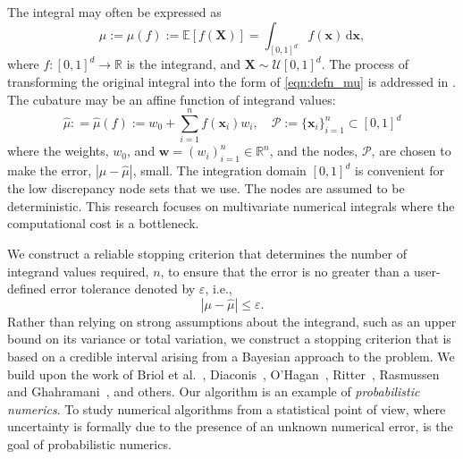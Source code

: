 \documentclass{svjour3}                     %
\newcommand{\bm}[1]{\boldsymbol{#1}}
\newcommand{\dif}[1]{\text{d}{#1}}
\newcommand{\reals}{\mathbb{R}}
\newcommand{\Ex}{\mathbb{E}}
\newcommand{\vw}{\bm{w}}
\newcommand{\vx}{\bm{x}}
\newcommand{\dvx}{\dif{\bm{x}}}
\newcommand{\hmu}{\widehat{\mu}}
\newcommand{\errtol}{\varepsilon}
\def\abs#1{\ensuremath{\left \lvert #1 \right \rvert}}
\begin{document}
The integral may often be expressed as
\begin{equation}
\label{eqn:defn_mu}
\mu:= \mu(f) := \Ex[f(\boldsymbol{X})] = \int_{[0,1]^d} f(\vx)\, \dvx, 
\end{equation}
where $f:[0,1]^d \to \reals$ is the integrand, and $\boldsymbol{X} \sim \mathcal{U}[0,1]^d$.  The process of transforming the original integral into the form of \eqref{eqn:defn_mu} is addressed in \cite{BecHae92b, Sid08a, Sid93, Lau96a, CriEtal07}.  The cubature may be an affine function of integrand values:
\begin{equation}
\label{eqn:defn_hmu}  %
\hmu: = \hmu(f) := w_0 + \sum_{i=1}^{n} f(\vx_i) w_i, \quad \mathcal{P} :=\{\vx_i\}_{i=1}^n \subset [0,1]^d
\end{equation}
where the weights, $w_0$, and  $\vw = (w_i)_{i=1}^n \in \reals^n$, and the nodes, $\mathcal{P}$, are chosen to make the error, $\abs{\mu - \hmu}$, small. The integration domain $[0,1]^d$ is convenient for the low discrepancy node sets that we use.  The nodes are assumed to be deterministic.
This research focuses on multivariate numerical integrals where the computational cost is a bottleneck. %






We construct a reliable stopping criterion that determines the number of integrand values required, $n$, to ensure that the error is no greater than a user-defined error tolerance denoted by $\varepsilon$, i.e., 
\begin{equation}
\label{eqn:err_crit} 
\abs{\mu - \hmu} \leq \errtol .
\end{equation}
Rather than relying on strong assumptions about the integrand, such as an upper bound on its variance or total variation, we construct a stopping criterion that is based on a credible interval arising from a Bayesian approach to the problem.  We build upon the work of Briol et al.~\cite{BriEtal18a}, Diaconis~\cite{Dia88a}, O'Hagan~\cite{OHa91a}, Ritter~\cite{Rit00a}, Rasmussen and Ghahramani~\cite{RasGha03a}, and others.  Our algorithm is an example of \emph{probabilistic numerics}.
To study numerical algorithms from a statistical point of view, where uncertainty is formally due to the presence of an unknown numerical error, is the goal of probabilistic numerics.
\end{document}
